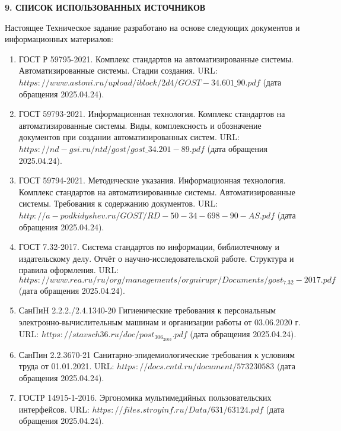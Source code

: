 \newpage
\begin{center}
  \textbf{\large 9. СПИСОК ИСПОЛЬЗОВАННЫХ ИСТОЧНИКОВ}
\end{center}

Настоящее Техническое задание разработано на основе следующих
документов и информационных материалов:

\begin{enumerate}
\item ГОСТ Р 59795-2021. Комплекс стандартов на автоматизированные системы. Автоматизированные системы. Стадии создания. URL: $https://www.astoni.ru/upload/iblock/2d4/GOST-34.601\_90.pdf$ (дата обращения 2025.04.24).
\item ГОСТ 59793-2021. Информационная технология. Комплекс стандартов на автоматизированные системы. Виды, комплексность и обозначение документов при создании автоматизированных систем. URL: $https://nd-gsi.ru/ntd/gost/gost\_34.201-89.pdf$ (дата обращения 2025.04.24).
\item ГОСТ 59794-2021. Методические указания. Информационная технология. Комплекс стандартов на автоматизированные системы. Автоматизированные системы. Требования к содержанию документов. URL: $http://a-podkidyshev.ru/GOST/RD-50-34-698-90-AS.pdf$ (дата обращения 2025.04.24).
\item ГОСТ 7.32-2017. Система стандартов по информации, библиотечному и издательскому делу. Отчёт о научно-исследовательской работе. Структура и правила оформления. URL: $https://www.rea.ru/ru/org/managements/orgnirupr/Documents/gost_7.32-2017.pdf$ (дата обращения 2025.04.24).
\item СанПиН 2.2.2./2.4.1340-20 Гигиенические требования к персональным электронно-вычислительным машинам и организации работы от 03.06.2020 г. URL: $https://stavsch36.ru/doc/post_306_2003.pdf$ (дата обращения 2025.04.24).
\item СанПин 2.2.3670-21 Санитарно-эпидемиологические требования к условиям труда от 01.01.2021. URL: $https://docs.cntd.ru/document/573230583$ (дата обращения 2025.04.24).
\item ГОСТР 14915-1-2016. Эргономика мультимедийных пользовательских интерфейсов. URL: $https://files.stroyinf.ru/Data/631/63124.pdf$ (дата обращения 2025.04.24).
\end{enumerate}
